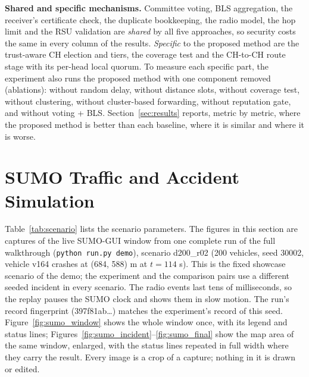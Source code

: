 \documentclass[11pt, a4paper]{article}
\begin{document}
\noindent\textbf{Shared and specific mechanisms.} Committee voting, BLS aggregation, the receiver's certificate check,
the duplicate bookkeeping, the radio model, the hop limit and the RSU validation are \emph{shared} by all five approaches,
so security costs the same in every column of the results. \emph{Specific} to the proposed method are the trust-aware
CH election and tiers, the coverage test and the CH-to-CH route stage with its per-head local quorum. To measure each
specific part, the experiment also runs the proposed method with one component removed (ablations): without random delay,
without distance slots, without coverage test, without clustering, without cluster-based forwarding, without reputation
gate, and without voting + BLS. Section~\ref{sec:results} reports, metric by metric, where the proposed method is
better than each baseline, where it is similar and where it is worse.

\section{SUMO Traffic and Accident Simulation}
\label{sec:sumo}
Table~\ref{tab:scenario} lists the scenario parameters. The figures in this section are captures of the live SUMO-GUI
window from one complete run of the full walkthrough (\texttt{python run.py demo}), scenario d200\_r02 (200 vehicles,
seed 30002, vehicle v164 crashes at (684, 588) m at $t = 114$ s). This is the fixed showcase scenario of the demo; the
experiment and the comparison pairs use a different seeded incident in every scenario. The radio events last tens of
milliseconds, so the replay pauses the SUMO clock and shows them in slow motion. The run's record fingerprint
(397f81ab\ldots) matches the experiment's record of this seed. Figure~\ref{fig:sumo_window} shows the whole window
once, with its legend and status lines; Figures~\ref{fig:sumo_incident}--\ref{fig:sumo_final} show the map area of the
same window, enlarged, with the status lines repeated in full width where they carry the result. Every image is a crop
of a capture; nothing in it is drawn or edited.
\end{document}
